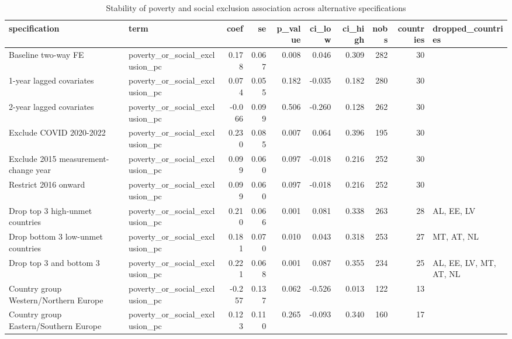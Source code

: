 \begin{table}
\caption{Stability of poverty and social exclusion association across alternative specifications}
\label{tab:regression_robustness_summary}
\begin{tabular}{llrrrrrrrl}
\toprule
specification & term & coef & se & p\_value & ci\_low & ci\_high & nobs & countries & dropped\_countries \\
\midrule
Baseline two-way FE & poverty\_or\_social\_exclusion\_pc & 0.178 & 0.067 & 0.008 & 0.046 & 0.309 & 282 & 30 &  \\
1-year lagged covariates & poverty\_or\_social\_exclusion\_pc & 0.074 & 0.055 & 0.182 & -0.035 & 0.182 & 280 & 30 &  \\
2-year lagged covariates & poverty\_or\_social\_exclusion\_pc & -0.066 & 0.099 & 0.506 & -0.260 & 0.128 & 262 & 30 &  \\
Exclude COVID 2020-2022 & poverty\_or\_social\_exclusion\_pc & 0.230 & 0.085 & 0.007 & 0.064 & 0.396 & 195 & 30 &  \\
Exclude 2015 measurement-change year & poverty\_or\_social\_exclusion\_pc & 0.099 & 0.060 & 0.097 & -0.018 & 0.216 & 252 & 30 &  \\
Restrict 2016 onward & poverty\_or\_social\_exclusion\_pc & 0.099 & 0.060 & 0.097 & -0.018 & 0.216 & 252 & 30 &  \\
Drop top 3 high-unmet countries & poverty\_or\_social\_exclusion\_pc & 0.210 & 0.066 & 0.001 & 0.081 & 0.338 & 263 & 28 & AL, EE, LV \\
Drop bottom 3 low-unmet countries & poverty\_or\_social\_exclusion\_pc & 0.181 & 0.070 & 0.010 & 0.043 & 0.318 & 253 & 27 & MT, AT, NL \\
Drop top 3 and bottom 3 & poverty\_or\_social\_exclusion\_pc & 0.221 & 0.068 & 0.001 & 0.087 & 0.355 & 234 & 25 & AL, EE, LV, MT, AT, NL \\
Country group Western/Northern Europe & poverty\_or\_social\_exclusion\_pc & -0.257 & 0.137 & 0.062 & -0.526 & 0.013 & 122 & 13 &  \\
Country group Eastern/Southern Europe & poverty\_or\_social\_exclusion\_pc & 0.123 & 0.110 & 0.265 & -0.093 & 0.340 & 160 & 17 &  \\
\bottomrule
\end{tabular}
\end{table}

